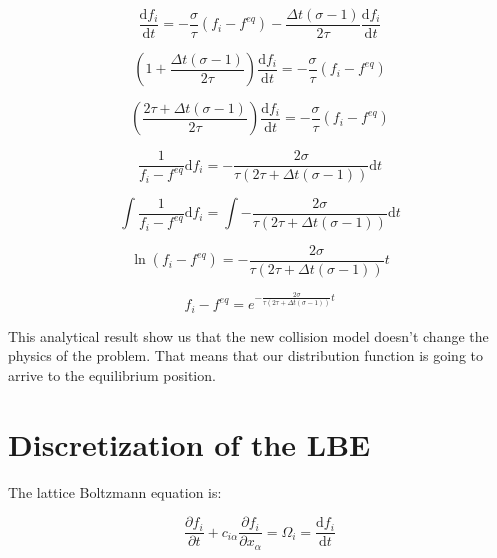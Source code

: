 \documentclass{article}
\begin{document}
\begin{equation}
    \frac{\mathrm{d} f_{i}}{\mathrm{d} t}= -\frac{\sigma}{\tau}(f_i-f^{eq}) - \frac{\Delta t(\sigma-1)}{2\tau}\frac{\mathrm{d}f_{i}}{\mathrm{d}t}
\end{equation}

\begin{equation*}
    \left(1 + \frac{\Delta t(\sigma-1)}{2\tau}\right)\frac{\mathrm{d} f_{i}}{\mathrm{d} t}= -\frac{\sigma}{\tau}(f_i-f^{eq}) 
\end{equation*}

\begin{equation*}
    \left(\frac{2\tau + \Delta t(\sigma-1)}{2\tau}\right)\frac{\mathrm{d} f_{i}}{\mathrm{d} t}= -\frac{\sigma}{\tau}(f_i-f^{eq}) 
\end{equation*}

\begin{equation*}
    \frac{1}{f_i-f^{eq}}\mathrm{d} f_{i}= -\frac{2\sigma}{\tau(2\tau + \Delta t(\sigma-1))}\mathrm{d} t 
\end{equation*}

\begin{equation*}
    \int\frac{1}{f_i-f^{eq}}\mathrm{d} f_{i}= \int-\frac{2\sigma}{\tau(2\tau + \Delta t(\sigma-1))}\mathrm{d} t 
\end{equation*}

\begin{equation*}
    \ln{(f_i-f^{eq})}= -\frac{2\sigma}{\tau(2\tau + \Delta t(\sigma-1))} t 
\end{equation*}

\begin{equation*}
    f_i-f^{eq}= e^{-\frac{2\sigma}{\tau(2\tau + \Delta t(\sigma-1))} t} 
\end{equation*}

This analytical result show us that the new collision model doesn't change the physics of the problem.
That means that our distribution function is going to arrive to the equilibrium position.

\section{Discretization of the LBE}

The lattice Boltzmann equation is: 

\begin{equation}
    \frac{\partial f_{i}}{\partial t} +c_{i\alpha }\frac{\partial f_{i}}{\partial x_{\alpha }} =\Omega _{i} =\frac{\mathrm{d} f_{i}}{\mathrm{d} t}
\end{equation}
\end{document}

